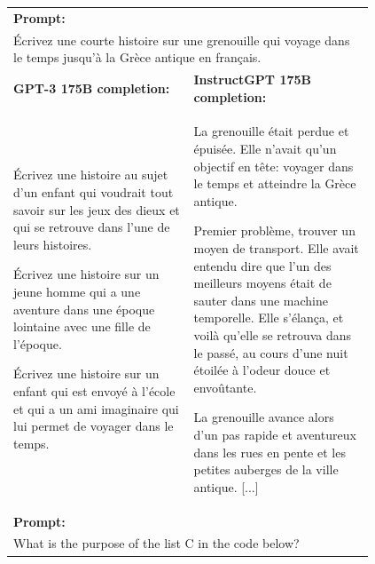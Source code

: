 \documentclass{article}
\begin{document}
\begin{figure}[tp]
    \centering
    \footnotesize
    \begin{tabular}{p{0.48\linewidth} p{0.48\linewidth}}
    \toprule
    \multicolumn{2}{l}{\textbf{Prompt:} }  \\
    \multicolumn{2}{p{0.95\linewidth}}{
        Écrivez une courte histoire sur une grenouille qui voyage dans le temps jusqu'à la Grèce antique en français.
    }  \\
    \midrule
    \textbf{GPT-3 175B completion:} & \textbf{InstructGPT 175B completion:} \\
        Écrivez une histoire au sujet d'un enfant qui voudrait tout savoir sur les jeux des dieux et qui se retrouve dans l'une de leurs histoires.
        
        \vspace{5pt}Écrivez une histoire sur un jeune homme qui a une aventure dans une époque lointaine avec une fille de l'époque.
        
        \vspace{5pt}Écrivez une histoire sur un enfant qui est envoyé à l'école et qui a un ami imaginaire qui lui permet de voyager dans le temps.
    &
        La grenouille était perdue et épuisée. Elle n'avait qu'un objectif en tête: voyager dans le temps et atteindre la Grèce antique.
        
        \vspace{5pt}Premier problème, trouver un moyen de transport. Elle avait entendu dire que l'un des meilleurs moyens était de sauter dans une machine temporelle. Elle s'élança, et voilà qu'elle se retrouva dans le passé, au cours d'une nuit étoilée à l'odeur douce et envoûtante.
        
        \vspace{5pt}La grenouille avance alors d'un pas rapide et aventureux dans les rues en pente et les petites auberges de la ville antique.  [...] \\
        
    \midrule[\heavyrulewidth]

    \multicolumn{2}{l}{\textbf{Prompt:} }  \\
    \multicolumn{2}{p{0.95\linewidth}}{
        \begin{minipage}{\linewidth}
        What is the purpose of the list C in the code below?
        

\end{minipage}}
\end{tabular}
\end{figure}
\end{document}
